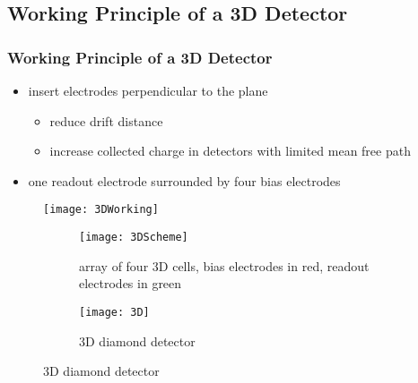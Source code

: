 \subsection{Working Principle of a 3D Detector}
\begin{frame}
	\frametitle{Working Principle of a 3D Detector}
	\begin{minipage}{8cm}
		\begin{itemize}
			\setlength{\itemsep}{\fill}
			\item insert electrodes perpendicular to the plane
			\begin{itemize}
				\item reduce drift distance
				\item increase collected charge in detectors with limited mean free path %
			\end{itemize}
			\item one readout electrode surrounded by four bias electrodes
		\end{itemize}
	\end{minipage}
	\begin{minipage}{4cm}
		\begin{figure}
			\centering
			\texttt{[image: 3DWorking]}
		\end{figure}
	\end{minipage}
	
	\begin{figure}
	  \centering
	  \begin{subfigure}[t]{0.45\textwidth}
		\centering
		\texttt{[image: 3DScheme]}
		\caption{array of four 3D cells, bias electrodes in red, readout electrodes in green}
	  \end{subfigure}
	  \begin{subfigure}[t]{0.45\textwidth}
		\centering
		\texttt{[image: 3D]}
		\caption{3D diamond detector}
	  \end{subfigure}
	\end{figure}
\end{frame}

